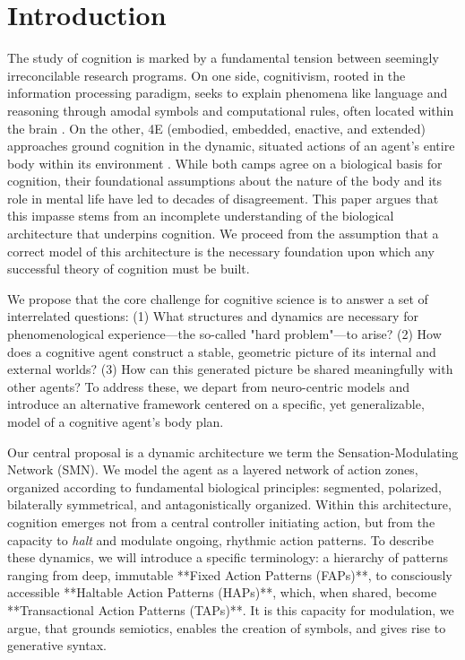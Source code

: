\section{Introduction}
\label{sec:introduction}
The study of cognition is marked by a fundamental tension between seemingly irreconcilable research programs. On one side, cognitivism, rooted in the information processing paradigm, seeks to explain phenomena like language and reasoning through amodal symbols and computational rules, often located within the brain \cite{chomsky1965aspects, fodor_modularity_1983}. On the other, 4E (embodied, embedded, enactive, and extended) approaches ground cognition in the dynamic, situated actions of an agent's entire body within its environment \cite{varela, noe_action_2004}. While both camps agree on a biological basis for cognition, their foundational assumptions about the nature of the body and its role in mental life have led to decades of disagreement. This paper argues that this impasse stems from an incomplete understanding of the biological architecture that underpins cognition. We proceed from the assumption that a correct model of this architecture is the necessary foundation upon which any successful theory of cognition must be built.

We propose that the core challenge for cognitive science is to answer a set of interrelated questions: (1) What structures and dynamics are necessary for phenomenological experience—the so-called "hard problem"—to arise? (2) How does a cognitive agent construct a stable, geometric picture of its internal and external worlds? (3) How can this generated picture be shared meaningfully with other agents? To address these, we depart from neuro-centric models and introduce an alternative framework centered on a specific, yet generalizable, model of a cognitive agent's body plan.

Our central proposal is a dynamic architecture we term the Sensation-Modulating Network (SMN). We model the agent as a layered network of action zones, organized according to fundamental biological principles: segmented, polarized, bilaterally symmetrical, and antagonistically organized. Within this architecture, cognition emerges not from a central controller initiating action, but from the capacity to \textit{halt} and modulate ongoing, rhythmic action patterns. To describe these dynamics, we will introduce a specific terminology: a hierarchy of patterns ranging from deep, immutable **Fixed Action Patterns (FAPs)**, to consciously accessible **Haltable Action Patterns (HAPs)**, which, when shared, become **Transactional Action Patterns (TAPs)**. It is this capacity for modulation, we argue, that grounds semiotics, enables the creation of symbols, and gives rise to generative syntax.


